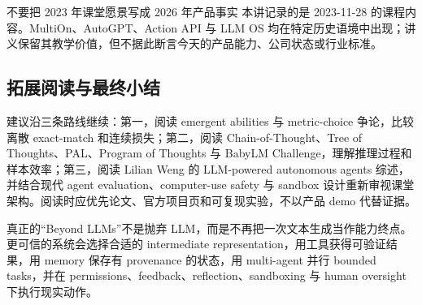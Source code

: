 \begin{warningbox}{不要把 2023 年课堂愿景写成 2026 年产品事实}
本讲记录的是 2023-11-28 的课程内容。MultiOn、AutoGPT、Action API 与 LLM OS 均在特定历史语境中出现；讲义保留其教学价值，但不据此断言今天的产品能力、公司状态或行业标准。
\end{warningbox}

\subsection{拓展阅读与最终小结}

\enlargethispage{5\baselineskip}

建议沿三条路线继续：第一，阅读 emergent abilities 与 metric-choice 争论，比较离散 exact-match 和连续损失；第二，阅读 Chain-of-Thought、Tree of Thoughts、PAL、Program of Thoughts 与 BabyLM Challenge，理解推理过程和样本效率；第三，阅读 Lilian Weng 的 LLM-powered autonomous agents 综述，并结合现代 agent evaluation、computer-use safety 与 sandbox 设计重新审视课堂架构。阅读时应优先论文、官方项目页和可复现实验，不以产品 demo 代替证据。

真正的“Beyond LLMs”不是抛弃 LLM，而是不再把一次文本生成当作能力终点。更可信的系统会选择合适的 intermediate representation，用工具获得可验证结果，用 memory 保存有 provenance 的状态，用 multi-agent 并行 bounded tasks，并在 permissions、feedback、reflection、sandboxing 与 human oversight 下执行现实动作。


